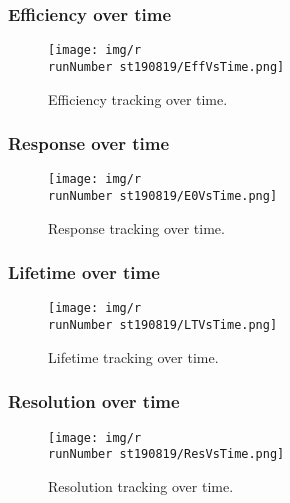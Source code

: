 \begin{frame}
\frametitle{Efficiency over time}
\begin{figure}
  \begin{center}
      \texttt{[image: img/r\\runNumber st190819/EffVsTime.png]}
    \caption{Efficiency tracking over time.}
  \end{center}
\end{figure}
\end{frame}

\begin{frame}
\frametitle{Response over time}
\begin{figure}
  \begin{center}
      \texttt{[image: img/r\\runNumber st190819/E0VsTime.png]}
    \caption{Response tracking over time.}
  \end{center}
\end{figure}
\end{frame}

\begin{frame}
\frametitle{Lifetime over time}
\begin{figure}
  \begin{center}
      \texttt{[image: img/r\\runNumber st190819/LTVsTime.png]}
    \caption{Lifetime tracking over time.}
  \end{center}
\end{figure}
\end{frame}

\begin{frame}
\frametitle{Resolution over time}
\begin{figure}
  \begin{center}
      \texttt{[image: img/r\\runNumber st190819/ResVsTime.png]}
    \caption{Resolution tracking over time.}
  \end{center}
\end{figure}
\end{frame}
